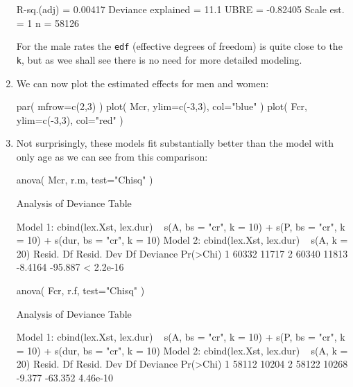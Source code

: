 \begin{enumerate}[resume]
\begin{Schunk}
\begin{Soutput}
R-sq.(adj) =  0.00417   Deviance explained = 11.1%
UBRE = -0.82405  Scale est. = 1         n = 58126
\end{Soutput}
\end{Schunk}
For the male rates the \texttt{edf} (effective degrees of freedom) is
quite close to the \texttt{k}, but as wee shall see there is no need
for more detailed modeling.


\item We can now plot the estimated effects for men and women:
\begin{Schunk}
\begin{Sinput}
 par( mfrow=c(2,3) )
 plot( Mcr, ylim=c(-3,3), col="blue" )
 plot( Fcr, ylim=c(-3,3), col="red" )
\end{Sinput}
\end{Schunk}
  
  
\item Not surprisingly, these models fit substantially better than the
  model with only age as we can see from this comparison:
\begin{Schunk}
\begin{Sinput}
 anova( Mcr, r.m, test="Chisq" )
\end{Sinput}
\begin{Soutput}
Analysis of Deviance Table

Model 1: cbind(lex.Xst, lex.dur) ~ s(A, bs = "cr", k = 10) + s(P, bs = "cr", 
    k = 10) + s(dur, bs = "cr", k = 10)
Model 2: cbind(lex.Xst, lex.dur) ~ s(A, k = 20)
  Resid. Df Resid. Dev      Df Deviance  Pr(>Chi)
1     60332      11717                           
2     60340      11813 -8.4164  -95.887 < 2.2e-16
\end{Soutput}
\begin{Sinput}
 anova( Fcr, r.f, test="Chisq" )
\end{Sinput}
\begin{Soutput}
Analysis of Deviance Table

Model 1: cbind(lex.Xst, lex.dur) ~ s(A, bs = "cr", k = 10) + s(P, bs = "cr", 
    k = 10) + s(dur, bs = "cr", k = 10)
Model 2: cbind(lex.Xst, lex.dur) ~ s(A, k = 20)
  Resid. Df Resid. Dev     Df Deviance Pr(>Chi)
1     58112      10204                         
2     58122      10268 -9.377  -63.352 4.46e-10
\end{Soutput}
\end{Schunk}






\end{enumerate}
